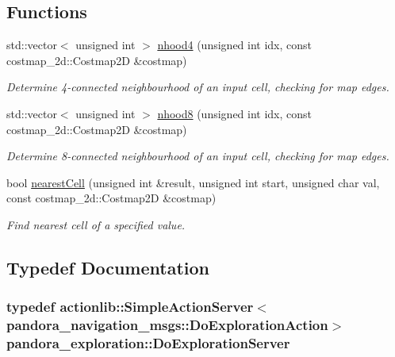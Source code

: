 \subsection*{\-Functions}
\begin{DoxyCompactItemize}
\item 
std\-::vector$<$ unsigned int $>$ \hyperlink{namespacepandora__exploration_aafaeb3a95484935929728cb3cd058e78}{nhood4} (unsigned int idx, const costmap\-\_\-2d\-::\-Costmap2\-D \&costmap)
\begin{DoxyCompactList}\small\item\em \-Determine 4-\/connected neighbourhood of an input cell, checking for map edges. \end{DoxyCompactList}\item 
std\-::vector$<$ unsigned int $>$ \hyperlink{namespacepandora__exploration_acfac7491815cb46eb0a7fe81bd17087e}{nhood8} (unsigned int idx, const costmap\-\_\-2d\-::\-Costmap2\-D \&costmap)
\begin{DoxyCompactList}\small\item\em \-Determine 8-\/connected neighbourhood of an input cell, checking for map edges. \end{DoxyCompactList}\item 
bool \hyperlink{namespacepandora__exploration_a178eafbcef39c912f5371a2b06dbae60}{nearest\-Cell} (unsigned int \&result, unsigned int start, unsigned char val, const costmap\-\_\-2d\-::\-Costmap2\-D \&costmap)
\begin{DoxyCompactList}\small\item\em \-Find nearest cell of a specified value. \end{DoxyCompactList}\end{DoxyCompactItemize}


\subsection{\-Typedef \-Documentation}
\hypertarget{namespacepandora__exploration_a897420c85c91df49559a24474430f015}{
\subsubsection[{\-Do\-Exploration\-Server}]{\setlength{\rightskip}{0pt plus 5cm}typedef actionlib\-::\-Simple\-Action\-Server$<$pandora\-\_\-navigation\-\_\-msgs\-::\-Do\-Exploration\-Action$>$ {\bf pandora\-\_\-exploration\-::\-Do\-Exploration\-Server}}}\label{namespacepandora__exploration_a897420c85c91df49559a24474430f015}


